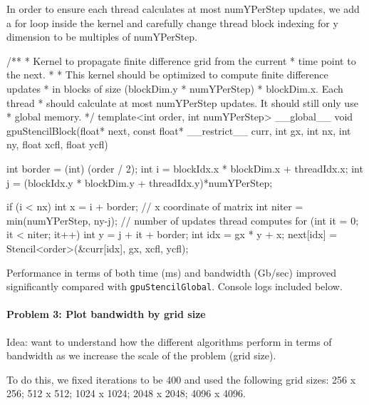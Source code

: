 \documentclass[12pt,letterpaper,twoside]{article}
\begin{document}
In order to ensure each thread calculates at most numYPerStep updates, we add 
a for loop inside the kernel and carefully change thread block indexing for y 
dimension to be multiples of numYPerStep.

\begin{cpp}
/**
 * Kernel to propagate finite difference grid from the current
 * time point to the next.
 *
 * This kernel should be optimized to compute finite difference updates
 * in blocks of size (blockDim.y * numYPerStep) * blockDim.x. Each thread
 * should calculate at most numYPerStep updates. It should still only use
 * global memory.
 */
template<int order, int numYPerStep>
__global__
void gpuStencilBlock(float* next, const float* __restrict__ curr, int gx, int nx, int ny,
                    float xcfl, float ycfl) {
    
    
    int border = (int) (order / 2);
    int i = blockIdx.x * blockDim.x + threadIdx.x;
    int j = (blockIdx.y * blockDim.y + threadIdx.y)*numYPerStep;

    if (i < nx) {
	    int x = i + border;  // x coordinate of matrix
        int niter = min(numYPerStep, ny-j);  // number of updates thread computes
        for (int it = 0; it < niter; it++) {
            int y = j + it + border;
            int idx = gx * y + x;
            next[idx] = Stencil<order>(&curr[idx], gx, xcfl, ycfl);
        }
    }
}
\end{cpp}

Performance in terms of both time (ms) and bandwidth (Gb/sec) improved significantly
compared with \texttt{gpuStencilGlobal}. Console logs included below.


\paragraph{Problem 3: Plot bandwidth by grid size } Idea: want to understand how the 
different algorithms perform in terms of bandwidth as we increase the scale of the 
problem (grid size).

To do this, we fixed iterations to be 400 and used the following grid sizes: 
256 x 256; 512 x 512; 1024 x 1024; 2048 x 2048; 4096 x 4096.
\end{document}
